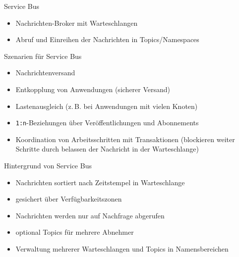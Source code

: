 \begin{flashcard}[]{Service Bus}
  \begin{itemize}
    \item Nachrichten-Broker mit Warteschlangen
    \item Abruf und Einreihen der Nachrichten in Topics/Namespaces
  \end{itemize}
\end{flashcard}

\begin{flashcard}[]{Szenarien für Service Bus}
  \begin{itemize}
    \item Nachrichtenversand
    \item Entkopplung von Anwendungen (sicherer Versand)
    \item Lastenausgleich (z.\,B. bei Anwendungen mit vielen Knoten)
    \item \texttt{1:n}-Beziehungen über Veröffentlichungen und Abonnements
    \item Koordination von Arbeitsschritten mit Transaktionen\newline
      (blockieren weiter Schritte durch belassen der Nachricht in der Warteschlange)
  \end{itemize}
\end{flashcard}

\begin{flashcard}[]{Hintergrund von Service Bus}
  \begin{itemize}
    \item Nachrichten sortiert nach Zeitstempel in Warteschlange
    \item gesichert über Verfügbarkeitszonen
    \item[!] Nachrichten werden nur auf Nachfrage abgerufen
    \item optional Topics für mehrere Abnehmer
    \item Verwaltung mehrerer Warteschlangen und Topics in Namensbereichen
  \end{itemize}
\end{flashcard}

